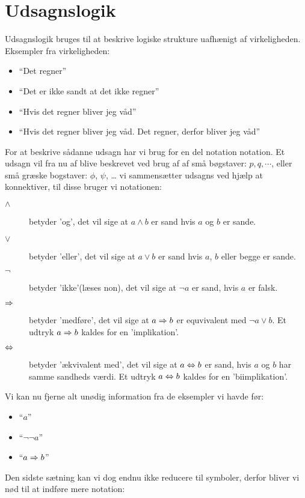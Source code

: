 \section{Udsagnslogik}
Udsagnslogik bruges til at beskrive logiske strukture uafhænigt af virkeligheden.
Eksempler fra virkeligheden:
\begin{itemize}
    \item ``Det regner''
    \item ``Det er ikke sandt at det ikke regner''
    \item ``Hvis det regner bliver jeg våd''
    \item ``Hvis det regner bliver jeg våd. Det regner, derfor bliver jeg våd''
\end{itemize}

For at beskrive sådanne udsagn har vi brug for en del notation notation. Et udsagn vil fra nu af blive beskrevet ved brug af af små bøgstaver: $p, q, \cdots$,
eller små græske bogstaver: $\phi$, $\psi$, \ldots
vi sammensætter udsagns ved hjælp at konnektiver, til disse bruger vi notationen:

\begin{description}
    \item[$\land$] betyder 'og', det vil sige at $a \land b$ er sand hvis $a$ og $b$ er sande.
    \item[$\lor$] betyder 'eller', det vil sige at $a \lor b$ er sand hvis $a$, $b$ eller begge er sande.
    \item[$\lnot$] betyder 'ikke'(læses non), det vil sige at $\lnot a$ er sand, hvis $a$ er falsk.
    \item[$\Rightarrow$] betyder 'medføre', det vil sige at $a \Rightarrow b$ er equvivalent med $\lnot a \lor b$. Et udtryk $a \Rightarrow b$ kaldes for en 'implikation'.
    \item[$\Leftrightarrow$] betyder 'ækvivalent med', det vil sige at $a \Leftrightarrow b$ er sand, hvis $a$ og $b$ har samme sandheds værdi. Et udtryk $a \Leftrightarrow b$ kaldes for en 'biimplikation'.
\end{description}



Vi kan nu fjerne alt unødig information fra de eksempler vi havde før:
\begin{itemize}
    \item ``$a$''
    \item ``$\lnot \lnot a$''
    \item ``$a \Rightarrow b$''
\end{itemize}

Den sidste sætning kan vi dog endnu ikke reducere til symboler, derfor bliver vi nød til at indføre mere notation:

